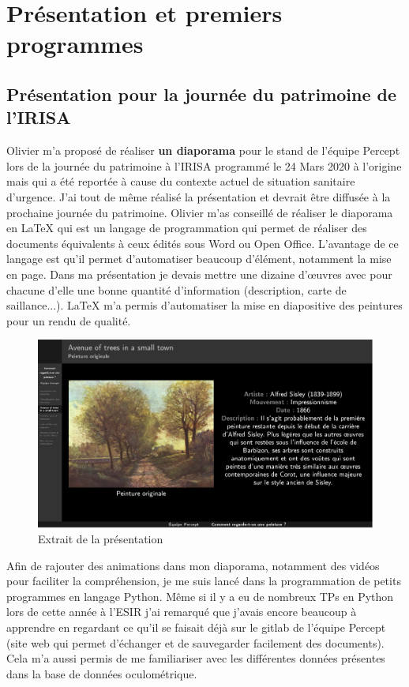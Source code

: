 \chapter{Présentation et premiers programmes}

\section{Présentation pour la journée du patrimoine de l'IRISA}

\par
Olivier m'a proposé de réaliser \textbf{un diaporama} pour le stand de l'équipe Percept lors de la journée du patrimoine à l'IRISA programmé le 24 Mars 2020 à l'origine mais qui a été reportée à cause du contexte actuel de situation sanitaire d'urgence. J'ai tout de même réalisé la présentation et devrait être diffusée à la prochaine journée du patrimoine. Olivier m'as conseillé de réaliser le diaporama en \LaTeX{} qui est un langage de programmation qui permet de réaliser des documents équivalents à ceux édités sous Word ou Open Office. L'avantage de ce langage est qu'il permet d'automatiser beaucoup d'élément, notamment la mise en page. Dans ma présentation je devais mettre une dizaine d'\oe{}uvres avec pour chacune d'elle une bonne quantité d'information (description, carte de saillance...). \LaTeX{} m'a permis d'automatiser la mise en diapositive des peintures pour un rendu de qualité.

\begin{figure}[!ht]
    \centering
    \includegraphics[width=0.7\linewidth]{datas/exemple_diapo.png}
    \caption{Extrait de la présentation}
    \label{ex_diapo}
\end{figure}

\par
Afin de rajouter des animations dans mon diaporama, notamment des vidéos pour faciliter la compréhension, je me suis lancé dans la programmation de petits programmes en langage Python. Même si il y a eu de nombreux TPs en Python lors de cette année à l'ESIR j'ai remarqué que j'avais encore beaucoup à apprendre en regardant ce qu'il se faisait déjà sur le gitlab de l'équipe Percept (site web qui permet d'échanger et de sauvegarder facilement des documents). Cela m'a aussi permis de me familiariser avec les différentes données présentes dans la base de données oculométrique.

